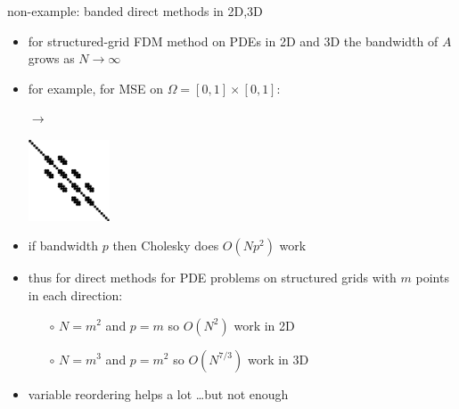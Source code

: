 \documentclass[hide notes,intlimits,usenames,dvipsnames]{beamer}
\begin{document}
\begin{frame}{non-example:  banded direct methods in 2D,3D}
\begin{itemize}
\item for structured-grid FDM method on PDEs in 2D and 3D the bandwidth of $A$ grows as $N \to \infty$
\item for example, for MSE on $\Omega=[0,1]\times[0,1]$:

\begin{center}
\begin{tikzpicture}[scale=1.6,baseline]  \end{tikzpicture} \qquad \begin{minipage}[b]{5mm} $\to$ \vspace{10mm} \end{minipage} \qquad \includegraphics[width=0.19\textwidth]{figs/spybanded}
\end{center}

\item if bandwidth $p$ then Cholesky does $O(N p^2)$ work
\item thus for direct methods for PDE problems on structured grids with $m$ points in each direction:
	\begin{itemize}
	\item[$\circ$] $N=m^2$ and $p=m$ so $O(N^2)$ work in 2D
	\item[$\circ$] $N=m^3$ and $p=m^2$ so $O(N^{7/3})$ work in 3D
	\end{itemize}
\item variable reordering helps a lot \dots but not enough
\end{itemize}
\end{frame}
\end{document}
